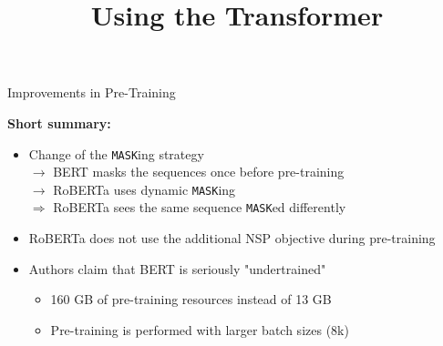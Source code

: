 



\newcommand{\titlefigure}{figure/sesamestreet.jpeg}
\newcommand{\learninggoals}{
\item Understand the improvements over BERT
\item Dynamic Masking}

\title{Using the Transformer}
\date{}




\begin{frame}{Improvements in Pre-Training}

\vfill

	\textbf{Short summary:}

	\begin{itemize}
		\item Change of the \texttt{MASK}ing strategy  \\
					$\rightarrow$ BERT masks the sequences once before pre-training  \\
					$\rightarrow$ RoBERTa uses dynamic \texttt{MASK}ing  \\
					$\Rightarrow$ RoBERTa sees the same sequence \texttt{MASK}ed differently
		\item RoBERTa does not use the additional NSP objective during pre-training
		\item Authors claim that BERT is seriously "undertrained"
			\begin{itemize}
				\item 160 GB of pre-training resources instead of 13 GB
				\item Pre-training is performed with larger batch sizes (8k)
			\end{itemize}
	\end{itemize}
	
\vfill

\end{frame}


